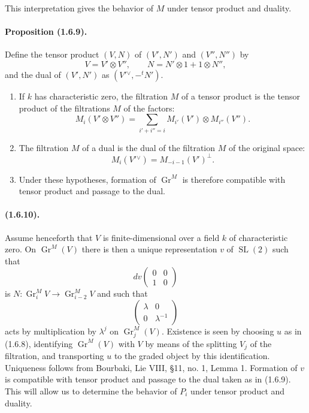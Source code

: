\documentclass[11pt]{article}
\theoremstyle{remark}
\newcommand{\Gr}{\operatorname{Gr}}
\begin{document}
This interpretation gives the behavior of $M$ under tensor product and duality.

\paragraph{Proposition (1.6.9).}
Define the tensor product $(V,N)$ of $(V',N')$ and $(V'',N'')$ by
\[
V=V'\otimes V'',\qquad N=N'\otimes 1+1\otimes N'',
\]
and the dual of $(V',N')$ as $(V'{}^\vee,-{}^tN')$.
\begin{enumerate}[label=(\roman*)]
\item If $k$ has characteristic zero, the filtration $M$ of a tensor product is the tensor product of the filtrations $M$ of the factors:
\[
M_i(V'\otimes V'')=\sum_{i'+i''=i}M_{i'}(V')\otimes M_{i''}(V'').
\]
\item The filtration $M$ of a dual is the dual of the filtration $M$ of the original space:
\[
M_i(V'{}^\vee)=M_{-i-1}(V')^\perp.
\]
\item Under these hypotheses, formation of $\Gr^M$ is therefore compatible with tensor product and passage to the dual.
\end{enumerate}

\paragraph{(1.6.10).}
Assume henceforth that $V$ is finite-dimensional over a field $k$ of characteristic zero. On $\Gr^M(V)$ there is then a unique representation $v$ of $\operatorname{SL}(2)$ such that
\[
dv\begin{pmatrix}0&0\\1&0\end{pmatrix}
\]
is $N:\Gr^M_i V\to\Gr^M_{i-2}V$ and such that
\[
\begin{pmatrix}\lambda&0\\0&\lambda^{-1}\end{pmatrix}
\]
acts by multiplication by $\lambda^j$ on $\Gr^M_j(V)$. Existence is seen by choosing $u$ as in (1.6.8), identifying $\Gr^M(V)$ with $V$ by means of the splitting $V_j$ of the filtration, and transporting $u$ to the graded object by this identification. Uniqueness follows from Bourbaki, Lie VIII, \S 11, no. 1, Lemma 1. Formation of $v$ is compatible with tensor product and passage to the dual taken as in (1.6.9). This will allow us to determine the behavior of $P_i$ under tensor product and duality.
\end{document}
